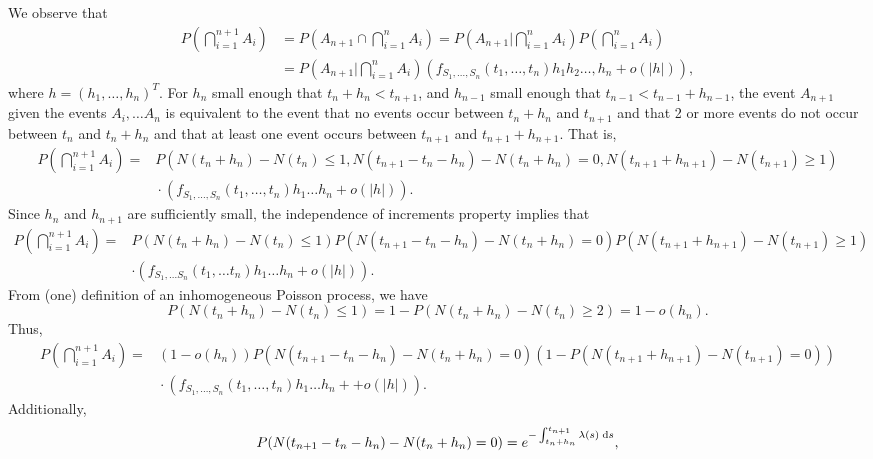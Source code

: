 \documentclass{homework}
\begin{document}
\begin{alphaparts}
		We observe that
		\begin{align*}
			P\left(\bigcap_{i=1}^{n+1}A_i\right) &= P\left(A_{n+1} \cap \bigcap_{i=1}^n A_i\right) = P\left(A_{n+1} \bigg\vert \bigcap_{i=1}^{n}A_i\right)P\left(\bigcap_{i=1}^nA_i\right) \\
			&= P\left(A_{n+1}\bigg\vert \bigcap_{i=1}^nA_i\right)(f_{S_1,\dots,S_n}(t_1,\dots,t_n)h_1h_2\dots,h_n + o(|h|)),
		\end{align*}
		where $h = (h_1,\dots, h_n)^T$. For $h_n$ small enough that $t_n+h_n < t_{n+1}$, and $h_{n-1}$ small enough that $t_{n-1} < t_{n-1} + h_{n-1}$, the event $A_{n+1}$ given the events $A_i, \dots A_n$ is equivalent to the event that no events occur between $t_n+h_n$ and $t_{n+1}$ and that 2 or more events do not occur between $t_n$ and $t_n + h_n$ and that at least one event occurs between $t_{n+1}$ and $t_{n+1} + h_{n+1}$. That is,
		\begin{align*}
			P\left(\bigcap_{i=1}^{n+1}A_i\right) ={} &P(N(t_n+h_n)-N(t_n)\le 1, N(t_{n+1} - t_n-h_n) - N(t_n+h_n) = 0, N(t_{n+1}+h_{n+1}) - N(t_{n+1}) \ge 1)\\ &{}\cdot (f_{S_1,\dots,S_n}(t_1,\dots,t_n)h_1\dots h_n + o(|h|)).
		\end{align*}
		Since $h_n$ and $h_{n+1}$ are sufficiently small, the independence of increments property implies that
		\begin{align*}
			P\left(\bigcap_{i=1}^{n+1}A_i\right) = {} &P(N(t_n+h_n) - N(t_n)\le 1)P(N(t_{n+1} - t_n-h_n) - N(t_n+h_n) = 0)P(N(t_{n+1} +h_{n+1}) - N(t_{n+1}) \ge 1)\\ {}&\cdot (f_{S_1,\dots S_n}(t_1, \dots  t_n)h_1\dots h_n + o(|h|)).
		\end{align*}
		From (one) definition of an inhomogeneous Poisson process, we have 
		\begin{equation*}
			P(N(t_n+h_n) - N(t_n) \le 1) = 1 - P(N(t_n + h_n) - N(t_n) \ge 2) = 1 - o(h_n).
		\end{equation*}
		Thus,
		\begin{align*}
			P\left(\bigcap_{i=1}^{n+1}A_i\right) = {}&(1-o(h_n))P(N(t_{n+1} - t_n -h_n) - N(t_n+h_n)=0)(1-P(N(t_{n+1} + h_{n+1}) - N(t_{n+1}) = 0))\\&{}\cdot (f_{S_1,\dots,S_n}(t_1,\dots, t_n)h_1\dots h_n + + o(|h|)).
		\end{align*}
		Additionally,
		\begin{equation*}
			P(N(t_{n+1} - t_n - h_n) - N(t_n + h_n) =0) = e^{-\int_{t_n+h_n}^{t_{n+1}}\lambda(s)\;\text{d} s},
		\end{equation*}

\end{alphaparts}
\end{document}
